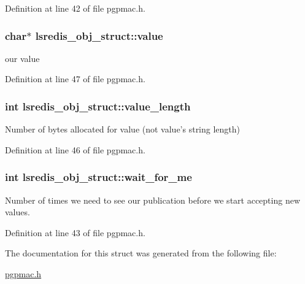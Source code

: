 Definition at line 42 of file pgpmac.\-h.

\hypertarget{structlsredis__obj__struct_a0465c65288e8101805a6f91049164517}{
\subsubsection[{value}]{\setlength{\rightskip}{0pt plus 5cm}char$\ast$ lsredis\-\_\-obj\-\_\-struct\-::value}}\label{structlsredis__obj__struct_a0465c65288e8101805a6f91049164517}


our value 



Definition at line 47 of file pgpmac.\-h.

\hypertarget{structlsredis__obj__struct_a664f0eaafb8dffc0dbde126e0340efb9}{
\subsubsection[{value\-\_\-length}]{\setlength{\rightskip}{0pt plus 5cm}int lsredis\-\_\-obj\-\_\-struct\-::value\-\_\-length}}\label{structlsredis__obj__struct_a664f0eaafb8dffc0dbde126e0340efb9}


Number of bytes allocated for value (not value's string length) 



Definition at line 46 of file pgpmac.\-h.

\hypertarget{structlsredis__obj__struct_a8bc1a536b7155a1e2a749c7c434b898b}{
\subsubsection[{wait\-\_\-for\-\_\-me}]{\setlength{\rightskip}{0pt plus 5cm}int lsredis\-\_\-obj\-\_\-struct\-::wait\-\_\-for\-\_\-me}}\label{structlsredis__obj__struct_a8bc1a536b7155a1e2a749c7c434b898b}


Number of times we need to see our publication before we start accepting new values. 



Definition at line 43 of file pgpmac.\-h.



The documentation for this struct was generated from the following file\-:\begin{DoxyCompactItemize}
\item 
\hyperlink{pgpmac_8h}{pgpmac.\-h}\end{DoxyCompactItemize}
